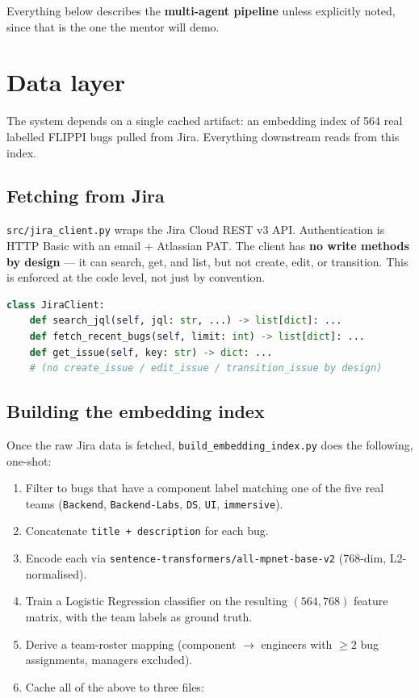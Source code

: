 \documentclass[11pt,a4paper]{article}
\begin{document}
Everything below describes the \textbf{multi-agent pipeline} unless
explicitly noted, since that is the one the mentor will demo.

\newpage

\section{Data layer}

The system depends on a single cached artifact: an embedding index of 564
real labelled FLIPPI bugs pulled from Jira. Everything downstream reads from
this index.

\subsection{Fetching from Jira}

\texttt{src/jira\_client.py} wraps the Jira Cloud REST v3 API. Authentication
is HTTP Basic with an email + Atlassian PAT. The client has \textbf{no write
methods by design} --- it can search, get, and list, but not create, edit,
or transition. This is enforced at the code level, not just by convention.

\begin{lstlisting}[language=python,caption={jira\_client.py sample --- read-only surface}]
class JiraClient:
    def search_jql(self, jql: str, ...) -> list[dict]: ...
    def fetch_recent_bugs(self, limit: int) -> list[dict]: ...
    def get_issue(self, key: str) -> dict: ...
    # (no create_issue / edit_issue / transition_issue by design)
\end{lstlisting}

\subsection{Building the embedding index}

Once the raw Jira data is fetched, \texttt{build\_embedding\_index.py}
does the following, one-shot:

\begin{enumerate}[leftmargin=1.4em,nosep]
\item Filter to bugs that have a component label matching one of the five
      real teams (\texttt{Backend}, \texttt{Backend-Labs}, \texttt{DS},
      \texttt{UI}, \texttt{immersive}).
\item Concatenate \texttt{title + description} for each bug.
\item Encode each via \texttt{sentence-transformers/all-mpnet-base-v2}
      (768-dim, L2-normalised).
\item Train a Logistic Regression classifier on the resulting
      $(564, 768)$ feature matrix, with the team labels as ground truth.
\item Derive a team-roster mapping (component $\rightarrow$ engineers with
      $\geq 2$ bug assignments, managers excluded).
\item Cache all of the above to three files:
\end{enumerate}
\end{document}

